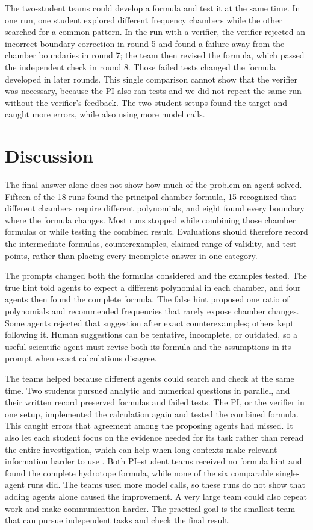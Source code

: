 \documentclass{article}
\begin{document}
The two-student teams could develop a formula and test it at the same
time. In one run, one student explored different frequency chambers
while the other searched for a common pattern. In the run with a
verifier, the verifier rejected an incorrect boundary correction in round 5 and found a
failure away from the chamber boundaries in round 7; the
team then revised the formula, which passed the independent check in round 8.
Those failed tests changed the formula developed in later rounds. This single
comparison cannot show that the verifier was necessary, because the PI
also ran tests and we did not repeat the same run without the verifier's
feedback. The two-student setups found the target and caught more
errors, while also using more model calls.

\section{Discussion}
\label{sec:discussion}

The final answer alone does not show how much of the problem an agent solved.
Fifteen of the 18 runs found the principal-chamber formula, 15 recognized that
different chambers require different polynomials, and eight found every
boundary where the formula changes. Most runs stopped while combining those
chamber formulas or while testing the combined result. Evaluations should
therefore record the intermediate formulas, counterexamples, claimed range of
validity, and test points, rather than placing every incomplete answer in one
category.

The prompts changed both the formulas considered and the examples tested. The
true hint told agents to expect a different polynomial in each chamber, and
four agents then found the complete formula. The false hint proposed one ratio
of polynomials and recommended frequencies that rarely expose chamber changes.
Some agents rejected that suggestion after exact counterexamples; others kept
following it. Human suggestions can be tentative, incomplete, or outdated, so
a useful scientific agent must revise both its formula and the assumptions in
its prompt when exact calculations disagree.

The teams helped because different agents could search and check at the same
time. Two students pursued analytic and numerical questions in
parallel, and their written record preserved formulas and failed tests. The
PI, or the verifier in one setup, implemented the calculation
again and tested the combined formula. This caught errors that agreement among
the proposing agents had missed. It also let each student focus on the
evidence needed for its task rather than reread the entire investigation, which
can help when long contexts make relevant information harder to use
\citep{Liu2023LostMiddle,Hsieh2024RULER}. Both PI--student teams received
no formula hint and found the complete hydrotope formula, while none of the six
comparable single-agent runs did. The teams used more model calls, so these runs
do not show that adding agents alone caused the improvement. A very large team
could also repeat work and make communication harder. The practical goal is the
smallest team that can pursue independent tasks and check the final result.
\end{document}

